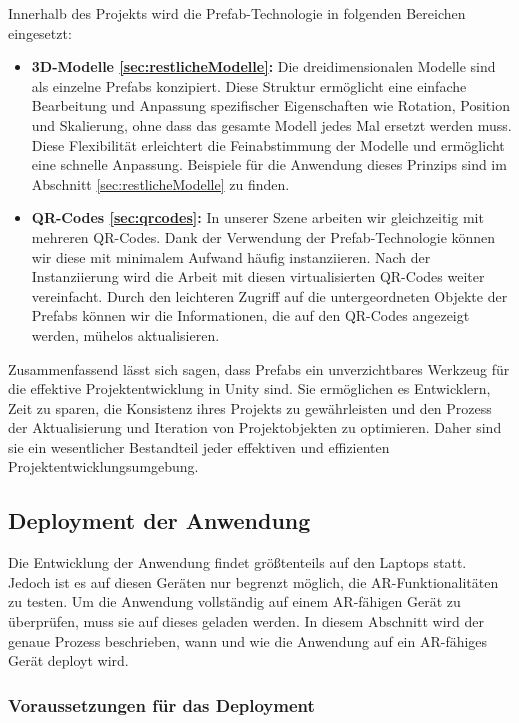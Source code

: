Innerhalb des Projekts wird die Prefab-Technologie in folgenden Bereichen eingesetzt:
\begin{itemize}
    \item \textbf{3D-Modelle \ref{sec:restlicheModelle}:} Die dreidimensionalen Modelle sind als einzelne Prefabs konzipiert. Diese Struktur ermöglicht eine einfache Bearbeitung und Anpassung spezifischer Eigenschaften wie Rotation, Position und Skalierung, ohne dass das gesamte Modell jedes Mal ersetzt werden muss. Diese Flexibilität erleichtert die Feinabstimmung der Modelle und ermöglicht eine schnelle Anpassung. Beispiele für die Anwendung dieses Prinzips sind im Abschnitt \ref{sec:restlicheModelle} zu finden.
    \item \textbf{QR-Codes \ref{sec:qrcodes}:} In unserer Szene arbeiten wir gleichzeitig mit mehreren QR-Codes. Dank der Verwendung der Prefab-Technologie können wir diese mit minimalem Aufwand häufig instanziieren. Nach der Instanziierung wird die Arbeit mit diesen virtualisierten QR-Codes weiter vereinfacht. Durch den leichteren Zugriff auf die untergeordneten Objekte der Prefabs können wir die Informationen, die auf den QR-Codes angezeigt werden, mühelos aktualisieren.
\end{itemize}

Zusammenfassend lässt sich sagen, dass Prefabs ein unverzichtbares Werkzeug für die effektive Projektentwicklung in Unity sind. Sie ermöglichen es Entwicklern, Zeit zu sparen, die Konsistenz ihres Projekts zu gewährleisten und den Prozess der Aktualisierung und Iteration von Projektobjekten zu optimieren. Daher sind sie ein wesentlicher Bestandteil jeder effektiven und effizienten Projektentwicklungsumgebung.


\subsection{Deployment der Anwendung}

Die Entwicklung der Anwendung findet größtenteils auf den Laptops statt. Jedoch ist es auf diesen Geräten nur begrenzt möglich, die AR-Funktionalitäten zu testen. Um die Anwendung vollständig auf einem AR-fähigen Gerät zu überprüfen, muss sie auf dieses geladen werden. In diesem Abschnitt wird der genaue Prozess beschrieben, wann und wie die Anwendung auf ein AR-fähiges Gerät deployt wird.

\subsubsection{Voraussetzungen für das Deployment}

